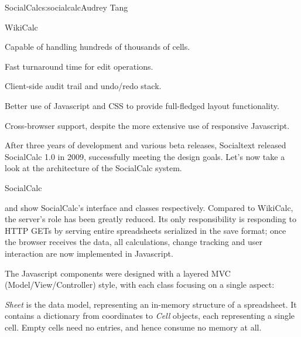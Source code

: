 \begin{aosachapter}{SocialCalc}{s:socialcalc}{Audrey Tang}
\begin{aosasect1}{WikiCalc}
\begin{aosaitemize}
  \item Capable of handling hundreds of thousands of cells.

  \item Fast turnaround time for edit operations.

  \item Client-side audit trail and undo/redo stack.

  \item Better use of Javascript and CSS to provide full-fledged layout
  functionality.

  \item Cross-browser support, despite the more extensive use of
  responsive Javascript.

\end{aosaitemize}

After three years of development and various beta releases, Socialtext
released SocialCalc 1.0 in 2009, successfully meeting the design
goals.  Let's now take a look at the architecture of the SocialCalc
system.

\end{aosasect1}

\begin{aosasect1}{SocialCalc}


 and  show
SocialCalc's interface and classes respectively.  Compared to
WikiCalc, the server's role has been greatly reduced.  Its only
responsibility is responding to HTTP GETs by serving entire
spreadsheets serialized in the save format; once the browser receives
the data, all calculations, change tracking and user interaction are
now implemented in Javascript.


The Javascript components were designed with a layered MVC
(Model/View/Controller) style, with each class focusing on a single
aspect:

\begin{aosadescription}

  \item{\emph{Sheet}} is the data model, representing an in-memory
  structure of a spreadsheet.
  It contains a dictionary from
  coordinates to \emph{Cell} objects, each representing a single cell.
  Empty cells need no entries, and hence consume no memory at all.


\end{aosadescription}
\end{aosasect1}
\end{aosachapter}
